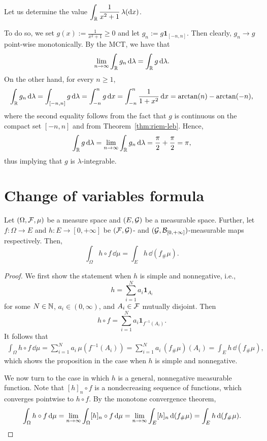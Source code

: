 \begin{example}\label{ex:computation_lebesgue_integral}
	Let us determine the value $\displaystyle \int_{\mathbb R} \frac{1}{x^2+1}\,\lambda(\mathrm{d} x)$.
	
	\noindent To do so, we set $g(x):= \frac{1}{x^2+1}\ge 0$ and let $g_n:= g\mathbf{1}_{[-n,n]}$. Then clearly, $g_n\to g$ point-wise monotonically. By the MCT, we have that
\[
	\lim_{n\to\infty} \int_{\mathbb R} g_n\,\mathrm{d}\lambda = \int_{\mathbb R} g\,\mathrm{d}\lambda.
\]
On the other hand, for every $n\ge 1$,
\[
	\int_{\mathbb R} g_n\,\mathrm{d}\lambda = \int_{[-n,n]} g\,\mathrm{d}\lambda = \int_{-n}^n g\,\mathrm{d} x = \int_{-n}^n \frac{1}{1+x^2}\,\mathrm{d} x = \arctan(n) - \arctan(-n),
\]
where the second equality follows from the fact that $g$ is continuous on the compact set $[-n,n]$ and from Theorem~\ref{thm:riem-leb}. Hence,
\[
	\int_{\mathbb R} g\,\mathrm{d}\lambda=\lim_{n\to\infty} \int_{\mathbb R} g_n\,\mathrm{d}\lambda = \frac{\pi}{2} + \frac{\pi}{2} = \pi,
\]
thus implying that $g$ is $\lambda$-integrable.
\end{example}

\section{Change of variables formula}
\label{sec:change-of-variables}

\begin{proposition}
Let $(\Omega, \mathcal F, \mu)$ be a measure space and $(E,\mathcal G)$ be a measurable space. Further, let $f\colon \Omega \to E$ and $h\colon E \to [0,+\infty]$ be $(\mathcal F,\mathcal G)$- and $(\mathcal G,\mathcal B_{[0,+\infty]})$-measurable maps respectively. Then,
\[
\int_\Omega h \circ f\,\dd \mu = \int_E h \, \dd (f_\# \mu).
\]
\end{proposition}

\begin{proof}
We first show the statement when $h$ is simple and nonnegative, i.e.,
\[
h = \sum_{i=1}^N a_i \mathbf{1}_{A_i}
\]
for some $N \in \mathbb N$, $a_i \in (0,\infty)$, and $A_i \in \mathcal F$ mutually disjoint. Then 
\[
	h \circ f = \sum_{i=1}^N a_i  \mathbf{1}_{f^{-1}(A_i)}.
\]
It follows that
\[
\begin{split}
\int_\Omega h \circ f\, \dd \mu 
= \sum_{i=1}^N a_i \, \mu(f^{-1}(A_i)) 
= \sum_{i=1}^N a_i \, (f_\# \mu)(A_i) 
= \int_E h \, \dd (f_\# \mu),
\end{split}
\]
which shows the proposition in the case when $h$ is simple and nonnegative. 

We now turn to the case in which $h$ is a general, nonnegative measurable function. Note that $[h]_n \circ f$ is a nondecreasing sequence of functions, which converges pointwise to $h \circ f$. By the monotone convergence theorem,
\[
\int_\Omega h \circ f\, \mathrm{d} \mu 
= \lim_{n \to \infty} \int_\Omega [h]_n \circ f\, \mathrm{d} \mu 
= \lim_{n \to \infty} \int_E [h]_n \, \mathrm{d} (f_\# \mu) 
= \int_E h \, \mathrm{d} (f_\# \mu).\qedhere
\]
\end{proof}

